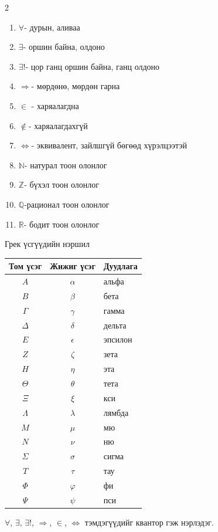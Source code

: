 \begin{multicols}{2}
\begin{enumerate}
\item $\forall$- дурын, аливаа
\item $\exists$- оршин байна, олдоно
\item $\exists!$- цор ганц оршин байна, ганц олдоно 
\item $\Rightarrow$- мөрдөнө, мөрдөн гарна
\item $\in$ - харяалагдна
\item $\notin$- харяалагдахгүй
\item $\Leftrightarrow$- эквивалент, зайлшгүй бөгөөд хүрэлцээтэй
\item $\mathbb{N}$- натурал тоон олонлог
\item $\mathbb{Z}$- бүхэл тоон олонлог
\item $\mathbb{Q}$-рационал тоон олонлог
\item $\mathbb{R}$- бодит тоон олонлог
\end{enumerate}
 Грек үсгүүдийн нэршил\\
\begin{tabular}{c|c|l}
\hline
Том үсэг & Жижиг үсэг & Дуудлага \\ \hline
$A$ & $\alpha$ & альфа \\
$B$ & $\beta$ & бета \\
$\Gamma$ & $\gamma$ & гамма \\
$\Delta$ & $\delta$ & дельта \\
$E$ & $\epsilon$ & эпсилон \\
$Z$ & $\zeta$ & зета \\
$H$ & $\eta$ & эта \\
$\Theta$ & $\theta$ & тета \\
$\Xi$ & $\xi$ & кси \\
$\Lambda$ & $\lambda$ & лямбда \\
$M$ & $\mu$ & мю \\
$N$ & $\nu$ & ню \\
$\Sigma$ & $\sigma$ & сигма \\
$T$ & $\tau$ & тау \\
$\Phi$ & $\varphi$ & фи \\
$\Psi$ & $\psi$ & пси  \\
\hline
\end{tabular}
\end{multicols}
\begin{remark}
     $\forall$, $\exists$, $\exists!$, $\Rightarrow$, $\in$, $\Leftrightarrow$ тэмдэгүүдийг квантор гэж нэрлэдэг.
\end{remark}
